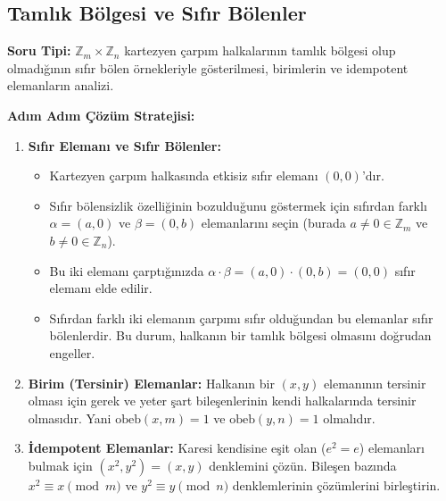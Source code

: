 \documentclass[11pt, a4paper]{article}
\begin{document}
\subsection{Tamlık Bölgesi ve Sıfır Bölenler}
\begin{konubox}[title={\faGraduationCap\enspace Soru Tipi ve Adım Adım Çözüm Stratejisi}]
\textbf{Soru Tipi:} $\mathbb{Z}_m \times \mathbb{Z}_n$ kartezyen çarpım halkalarının tamlık bölgesi olup olmadığının sıfır bölen örnekleriyle gösterilmesi, birimlerin ve idempotent elemanların analizi.

\textbf{Adım Adım Çözüm Stratejisi:}
\begin{enumerate}
    \item \textbf{Sıfır Elemanı ve Sıfır Bölenler:}
    \begin{itemize}
        \item Kartezyen çarpım halkasında etkisiz sıfır elemanı $(0, 0)$'dır.
        \item Sıfır bölensizlik özelliğinin bozulduğunu göstermek için sıfırdan farklı $\alpha = (a, 0)$ ve $\beta = (0, b)$ elemanlarını seçin (burada $a \neq 0 \in \mathbb{Z}_m$ ve $b \neq 0 \in \mathbb{Z}_n$).
        \item Bu iki elemanı çarptığınızda $\alpha \cdot \beta = (a, 0) \cdot (0, b) = (0, 0)$ sıfır elemanı elde edilir.
        \item Sıfırdan farklı iki elemanın çarpımı sıfır olduğundan bu elemanlar sıfır bölenlerdir. Bu durum, halkanın bir tamlık bölgesi olmasını doğrudan engeller.
    \end{itemize}
    \item \textbf{Birim (Tersinir) Elemanlar:} Halkanın bir $(x, y)$ elemanının tersinir olması için gerek ve yeter şart bileşenlerinin kendi halkalarında tersinir olmasıdır. Yani $\text{obeb}(x, m) = 1$ ve $\text{obeb}(y, n) = 1$ olmalıdır.
    \item \textbf{İdempotent Elemanlar:} Karesi kendisine eşit olan ($e^2 = e$) elemanları bulmak için $(x^2, y^2) = (x, y)$ denklemini çözün. Bileşen bazında $x^2 \equiv x \pmod m$ ve $y^2 \equiv y \pmod n$ denklemlerinin çözümlerini birleştirin.
\end{enumerate}
\end{konubox}

\newpage
\end{document}
